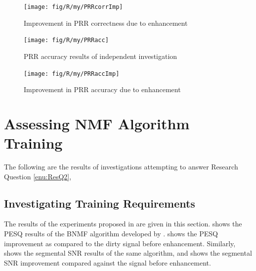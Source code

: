 \begin{figure}[h]
\noindent \begin{centering}
\texttt{[image: fig/R/my/PRRcorrImp]}
\par\end{centering}

\protect\caption{\label{fig:my-PRRcorr-imp}Improvement in \foreignlanguage{australian}{\acs{PRR}
correctness due to enhancement}%
}
\end{figure}


\begin{figure}[h]
\noindent \begin{centering}
\texttt{[image: fig/R/my/PRRacc]}
\par\end{centering}

\protect\caption{\label{fig:my-PRRacc}\foreignlanguage{australian}{\acs{PRR} accuracy
results of independent investigation}%
}
\end{figure}


\begin{figure}[h]
\noindent \begin{centering}
\texttt{[image: fig/R/my/PRRaccImp]}
\par\end{centering}

\protect\caption{\label{fig:my-PRRacc-imp}Improvement in \foreignlanguage{australian}{\acs{PRR}
accuracy due to enhancement}%
}
\end{figure}


\clearpage{}


\section{Assessing \acl{NMF} Algorithm Training}

The following are the results of investigations attempting to answer
Research Question \ref{enu:ResQ2}, \textit{\RQtwo{}}


\subsection{Investigating Training Requirements}

The results of the experiments proposed in 
are given in this section.  shows the \ac{PESQ}
results of the \ac{BNMF} algorithm developed by \citet{mohammadiha2013supervised}.
 shows the \ac{PESQ} improvement as
compared to the dirty signal before enhancement. Similarly, 
shows the segmental \ac{SNR} results of the same algorithm, and 
shows the segmental \ac{SNR} improvement compared against the signal
before enhancement.

